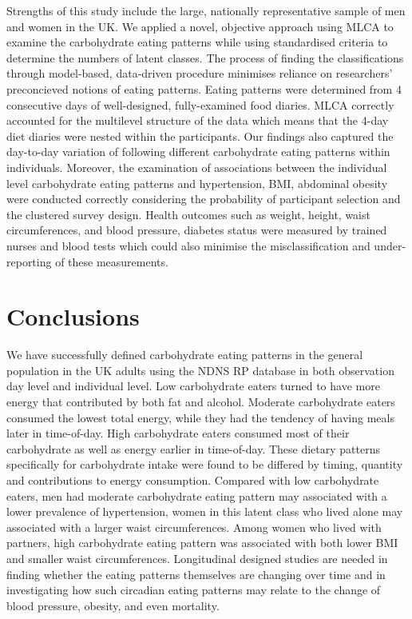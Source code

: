 Strengths of this study include the large, nationally representative sample of men and women in the UK. We applied a novel, objective approach using MLCA to examine the carbohydrate eating patterns while using standardised criteria to determine the numbers of latent classes. The process of finding the classifications through model-based, data-driven procedure minimises reliance on researchers' preconcieved notions of eating patterns. Eating patterns were determined from 4 consecutive days of well-designed, fully-examined food diaries. MLCA correctly accounted for the multilevel structure of the data which means that the 4-day diet diaries were nested within the participants. Our findings also captured the day-to-day variation of following different carbohydrate eating patterns within individuals. Moreover, the examination of associations between the individual level carbohydrate eating patterns and hypertension, BMI, abdominal obesity were conducted correctly considering the probability of participant selection and the clustered survey design. Health outcomes such as weight, height, waist circumferences, and blood pressure, diabetes status were measured by trained nurses and blood tests which could also minimise the misclassification and under-reporting of these measurements.

\section{Conclusions}

We have successfully defined carbohydrate eating patterns in the general population in the UK adults using the NDNS RP database in both observation day level and individual level. Low carbohydrate eaters turned to have more energy that contributed by both fat and alcohol. Moderate carbohydrate eaters consumed the lowest total energy, while they had the tendency of having meals later in time-of-day. High carbohydrate eaters consumed most of their carbohydrate as well as energy earlier in time-of-day. These dietary patterns specifically for carbohydrate intake were found to be differed by timing, quantity and contributions to energy consumption. Compared with low carbohydrate eaters, men had moderate carbohydrate eating pattern may associated with a lower prevalence of hypertension, women in this latent class who lived alone may associated with a larger waist circumferences. Among women who lived with partners, high carbohydrate eating pattern was associated with both lower BMI and smaller waist circumferences. Longitudinal designed studies are needed in finding whether the eating patterns themselves are changing over time and in investigating how such circadian eating patterns may relate to the change of blood pressure, obesity, and even mortality.